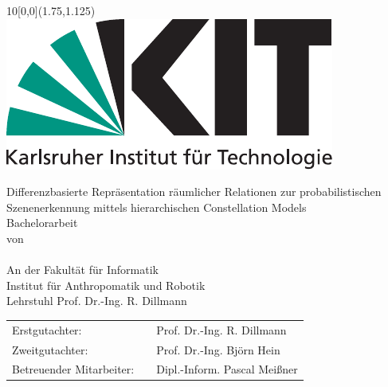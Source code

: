 \newcommand{\diameter}{20}
\newcommand{\xone}{-50}
\newcommand{\xtwo}{450}
\newcommand{\yone}{60}
\newcommand{\ytwo}{-700}

\newcommand{\timestart}{11. Juni 2017}
\newcommand{\timeend}{10. September 2017}
\newcommand{\submissiontime}{DD. MM. 20XX}

\begin{titlepage}

  \begin{textblock}{10}[0,0](1.75,1.125)
    \includegraphics[width=.3\textwidth]{bilder/Kitlogo_de_rgb.pdf}
  \end{textblock}

  \vspace*{3.5cm}
  \begin{center}
    \Huge{Differenzbasierte Repräsentation räumlicher Relationen zur probabilistischen Szenenerkennung mittels hierarchischen Constellation Models}\\
    \vspace*{2cm}
    \Large{Bachelorarbeit\\von}\\
    \vspace*{1cm}
    \huge{\myname}\\
    \vspace*{1cm}
    \Large{An der Fakultät für Informatik\\Institut für Anthropomatik und Robotik\\Lehrstuhl Prof. Dr.-Ing. R. Dillmann}
  \end{center}

  \vspace*{1cm}
  \Large{
    \begin{center}
      \begin{tabular}[ht]{l c l}
        Erstgutachter: & \hfill  & Prof. Dr.-Ing. R. Dillmann\\
        Zweitgutachter: & \hfill  & Prof. Dr.-Ing. Björn Hein\\
        Betreuender Mitarbeiter: & \hfill  & Dipl.-Inform. Pascal Meißner\\
      \end{tabular}
    \end{center}
  }


\end{titlepage}
